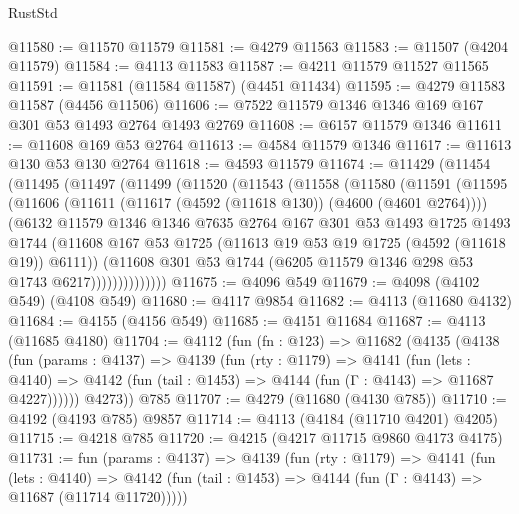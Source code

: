 \begin{lexlean}{RustStd}
\begin{coremodule}
@11580 := @11570 @11579
@11581 := @4279 @11563
@11583 := @11507 (@4204 @11579)
@11584 := @4113 @11583
@11587 := @4211 @11579 @11527 @11565
@11591 := @11581 (@11584 @11587) (@4451 @11434)
@11595 := @4279 @11583 @11587 (@4456 @11506)
@11606 := @7522 @11579 @1346 @1346 @169 @167 @301 @53 @1493 @2764 @1493 @2769
@11608 := @6157 @11579 @1346
@11611 := @11608 @169 @53 @2764
@11613 := @4584 @11579 @1346
@11617 := @11613 @130 @53 @130 @2764
@11618 := @4593 @11579
@11674 := @11429
    (@11454
      (@11495
        (@11497
          (@11499
            (@11520
              (@11543
                (@11558
                  (@11580
                    (@11591
                      (@11595
                        (@11606
                          (@11611 (@11617 (@4592 (@11618 @130)) (@4600 (@4601 @2764))))
                          (@6132
                            @11579
                            @1346
                            @1346
                            @7635
                            @2764
                            @167
                            @301
                            @53
                            @1493
                            @1725
                            @1493
                            @1744
                            (@11608
                              @167
                              @53
                              @1725
                              (@11613 @19 @53 @19 @1725 (@4592 (@11618 @19)) @6111))
                            (@11608
                              @301
                              @53
                              @1744
                              (@6205 @11579 @1346 @298 @53 @1743 @6217))))))))))))))
@11675 := @4096 @549
@11679 := @4098 (@4102 @549) (@4108 @549)
@11680 := @4117 @9854
@11682 := @4113 (@11680 @4132)
@11684 := @4155 (@4156 @549)
@11685 := @4151 @11684
@11687 := @4113 (@11685 @4180)
@11704 := @4112
    (fun (fn : @123) =>
    @11682
      (@4135
        (@4138
          (fun (params : @4137) =>
          @4139
            (fun (rty : @1179) =>
            @4141
              (fun (lets : @4140) =>
              @4142 (fun (tail : @1453) => @4144 (fun (Γ : @4143) => @11687 @4227))))))
        @4273))
    @785
@11707 := @4279 (@11680 (@4130 @785))
@11710 := @4192 (@4193 @785) @9857
@11714 := @4113 (@4184 (@11710 @4201) @4205)
@11715 := @4218 @785
@11720 := @4215 (@4217 @11715 @9860 @4173 @4175)
@11731 := fun (params : @4137) =>
  @4139
    (fun (rty : @1179) =>
    @4141
      (fun (lets : @4140) =>
      @4142 (fun (tail : @1453) => @4144 (fun (Γ : @4143) => @11687 (@11714 @11720)))))

\end{coremodule}
\end{lexlean}
